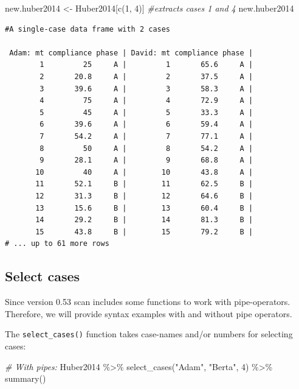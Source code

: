 \documentclass[
]{book}
\newenvironment{Shaded}{\begin{snugshade}}{\end{snugshade}}
\newcommand{\CommentTok}[1]{\textcolor[rgb]{0.56,0.35,0.01}{\textit{#1}}}
\newcommand{\DecValTok}[1]{\textcolor[rgb]{0.00,0.00,0.81}{#1}}
\newcommand{\FunctionTok}[1]{\textcolor[rgb]{0.00,0.00,0.00}{#1}}
\newcommand{\NormalTok}[1]{#1}
\newcommand{\OtherTok}[1]{\textcolor[rgb]{0.56,0.35,0.01}{#1}}
\newcommand{\SpecialCharTok}[1]{\textcolor[rgb]{0.00,0.00,0.00}{#1}}
\newcommand{\StringTok}[1]{\textcolor[rgb]{0.31,0.60,0.02}{#1}}
\begin{document}
\begin{Shaded}
\begin{Highlighting}[]
\NormalTok{new.huber2014 }\OtherTok{\textless{}{-}}\NormalTok{ Huber2014[}\FunctionTok{c}\NormalTok{(}\DecValTok{1}\NormalTok{, }\DecValTok{4}\NormalTok{)] }\CommentTok{\#extracts cases 1 and 4}
\NormalTok{new.huber2014}
\end{Highlighting}
\end{Shaded}

\begin{verbatim}
#A single-case data frame with 2 cases

 Adam: mt compliance phase | David: mt compliance phase |
        1         25     A |         1       65.6     A |
        2       20.8     A |         2       37.5     A |
        3       39.6     A |         3       58.3     A |
        4         75     A |         4       72.9     A |
        5         45     A |         5       33.3     A |
        6       39.6     A |         6       59.4     A |
        7       54.2     A |         7       77.1     A |
        8         50     A |         8       54.2     A |
        9       28.1     A |         9       68.8     A |
       10         40     A |        10       43.8     A |
       11       52.1     B |        11       62.5     B |
       12       31.3     B |        12       64.6     B |
       13       15.6     B |        13       60.4     B |
       14       29.2     B |        14       81.3     B |
       15       43.8     B |        15       79.2     B |
# ... up to 61 more rows
\end{verbatim}

\hypertarget{select-cases}{%
\subsection{Select cases}\label{select-cases}}

Since version 0.53 scan includes some functions to work with pipe-operators. Therefore, we will provide syntax examples with and without pipe operators.

The \texttt{select\_cases()} function takes case-names and/or numbers for selecting cases:

\begin{Shaded}
\begin{Highlighting}[]
\CommentTok{\# With pipes:}
\NormalTok{Huber2014 }\SpecialCharTok{\%\textgreater{}\%}
  \FunctionTok{select\_cases}\NormalTok{(}\StringTok{"Adam"}\NormalTok{, }\StringTok{"Berta"}\NormalTok{, }\DecValTok{4}\NormalTok{) }\SpecialCharTok{\%\textgreater{}\%}
  \FunctionTok{summary}\NormalTok{()}
\end{Highlighting}
\end{Shaded}
\end{document}
